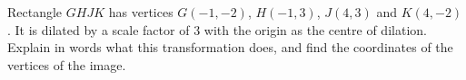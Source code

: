 Rectangle $GHJK$ has vertices $G(-1,-2)$, $H(-1,3)$, $J(4,3)$ and $K(4,-2)$. It is dilated by a scale factor of $3$ with the origin as the centre of dilation. Explain in words what this transformation does, and find the coordinates of the vertices of the image.

